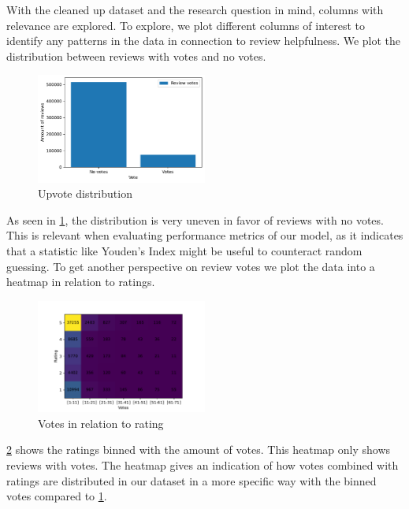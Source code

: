 \documentclass[twoside,twocolumn]{article}
\begin{document}
With the cleaned up dataset and the research question in mind, columns with relevance are explored. To explore, we plot different columns of interest to identify any patterns in the data in connection to review helpfulness. We plot the distribution between reviews with votes and no votes.
\begin{figure}[h]
	\centering
	\includegraphics[width=0.5\textwidth]{img/no_votes_vs_votes.pdf}
	\caption{Upvote distribution}
	\label{fig:votes_distribution}
\end{figure}
As seen in \figurename{\ref{fig:votes_distribution}}, the distribution is very uneven in favor of reviews with no votes. This is relevant when evaluating performance metrics of our model, as it indicates that a statistic like Youden's Index might be useful to counteract random guessing. To get another perspective on review votes we plot the data into a heatmap in relation to ratings.
\begin{figure}[h]
	\centering
	\includegraphics[width=0.5\textwidth]{img/rating_vote_heatmap_excluding_no_votes.pdf}
	\caption{Votes in relation to rating}
	\label{fig:rating_vote_heatmap}
\end{figure}
\figurename{\ref{fig:rating_vote_heatmap}} shows the ratings binned with the amount of votes. This heatmap only shows reviews with votes. The heatmap gives an indication of how votes combined with ratings are distributed in our dataset in a more specific way with the binned votes compared to \figurename{\ref{fig:votes_distribution}}.

\end{document}
